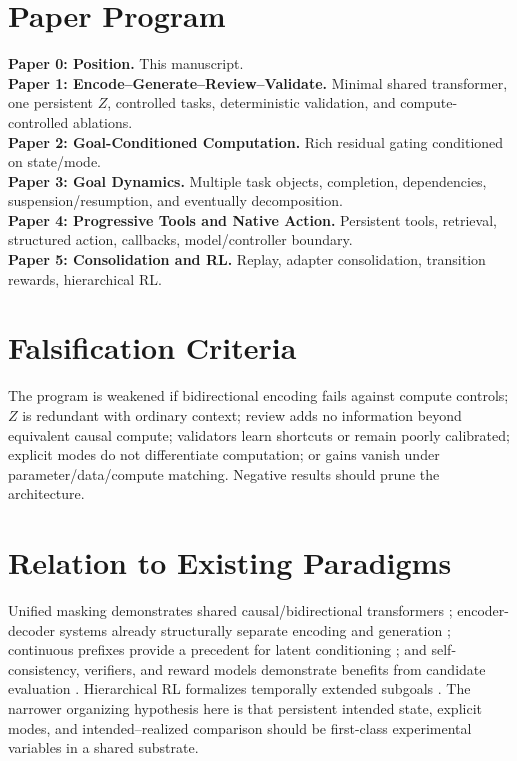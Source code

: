 \documentclass[11pt]{article}
\begin{document}
\section{Paper Program}
\textbf{Paper 0: Position.} This manuscript.\\
\textbf{Paper 1: Encode--Generate--Review--Validate.} Minimal shared transformer, one persistent $Z$, controlled tasks, deterministic validation, and compute-controlled ablations.\\
\textbf{Paper 2: Goal-Conditioned Computation.} Rich residual gating conditioned on state/mode.\\
\textbf{Paper 3: Goal Dynamics.} Multiple task objects, completion, dependencies, suspension/resumption, and eventually decomposition.\\
\textbf{Paper 4: Progressive Tools and Native Action.} Persistent tools, retrieval, structured action, callbacks, model/controller boundary.\\
\textbf{Paper 5: Consolidation and RL.} Replay, adapter consolidation, transition rewards, hierarchical RL.

\section{Falsification Criteria}
The program is weakened if bidirectional encoding fails against compute controls; $Z$ is redundant with ordinary context; review adds no information beyond equivalent causal compute; validators learn shortcuts or remain poorly calibrated; explicit modes do not differentiate computation; or gains vanish under parameter/data/compute matching. Negative results should prune the architecture.

\section{Relation to Existing Paradigms}
Unified masking demonstrates shared causal/bidirectional transformers \citep{dong2019unified}; encoder-decoder systems already structurally separate encoding and generation \citep{vaswani2017attention,raffel2020exploring}; continuous prefixes provide a precedent for latent conditioning \citep{li2021prefixtuning}; and self-consistency, verifiers, and reward models demonstrate benefits from candidate evaluation \citep{wang2023selfconsistency,cobbe2021verifiers,ouyang2022training}. Hierarchical RL formalizes temporally extended subgoals \citep{sutton1999between}. The narrower organizing hypothesis here is that persistent intended state, explicit modes, and intended--realized comparison should be first-class experimental variables in a shared substrate.
\end{document}
